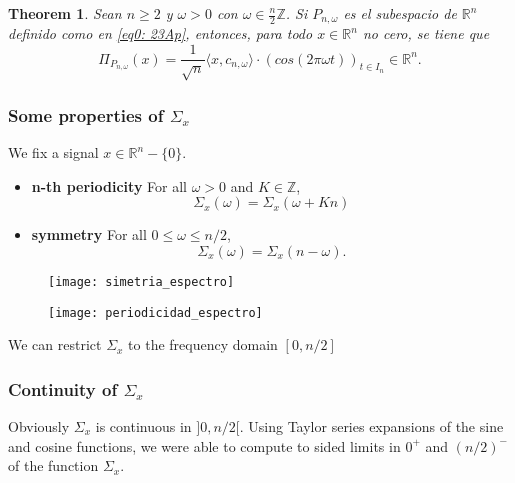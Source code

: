 \documentclass[]{beamer}
\newtheorem{teo}{\bf Theorem}
\theoremstyle{definition}
\newcommand{\IR}{\mathbb{R}}
\newcommand{\IZ}{\mathbb{Z}}
\begin{document}
\begin{frame}
\begin{teo}
\label{teo: amelie2}
Sean $n \geq 2$ y $\omega > 0$ con $\omega \in \frac{n}{2}\IZ$.
Si $P_{n, \omega}$ es el subespacio de $\IR^{n}$ definido como 
en \eqref{eq0: 23Ap}, entonces, para todo 
$x \in \IR^{n}$ no cero, se tiene que
\begin{equation}
\label{ec: desfase explicito 2}
\Pi_{P_{n, \omega}} (x) = 
\frac{1}{\sqrt{n}} \langle x, c_{n, \omega} \rangle
\cdot (cos (2 \pi \omega t))_{t \in I_{n}} \in \IR^{n}.
\end{equation}
\end{teo}

\end{frame}


\begin{frame}
\frametitle{Some properties of $\Sigma_{x}$}
We fix a signal $x \in \IR^{n}-\{ 0\}$.
\begin{itemize}
	\item \textbf{n-th periodicity} For all $\omega >0$ and $K \in \IZ$,
	\[
	\Sigma_{x}(\omega) = \Sigma_{x}(\omega + Kn)
	\]
	\item \textbf{symmetry} For all $0 \leq \omega \leq n/2$, 
	\[
	\Sigma_{x}(\omega) = \Sigma_{x}(n-\omega).
	\]
\end{itemize}
\end{frame}

\begin{frame}
\begin{figure}[h]
\texttt{[image: simetria\_espectro]}
\end{figure}

\begin{figure}[h]
\texttt{[image: periodicidad\_espectro]}
\end{figure}

We can restrict $\Sigma_{x}$ to the frequency domain $[0, n/2]$
\end{frame}

\begin{frame}
\frametitle{Continuity of $\Sigma_{x}$}
Obviously $\Sigma_{x}$ is continuous in $]0, n/2[$. 
Using Taylor series expansions of the sine and cosine functions, we
were able to compute to sided limits in $0^{+}$ and $(n/2)^{-}$
of the function 
$\Sigma_{x}$.
\end{frame}
\end{document}
